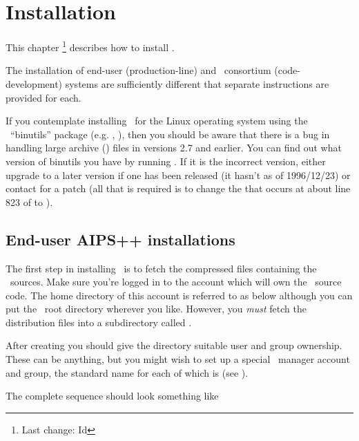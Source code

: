 \chapter{Installation}
\label{Installation}

This chapter \footnote{Last change:
$ $Id$ $}
describes how to install \aipspp.

The installation of end-user (production-line) and \aipspp\ consortium
(code-development) systems are sufficiently different that separate
instructions are provided for each.

If you contemplate installing \aipspp\ for the Linux operating system using
the \gnu\ ``binutils'' package (e.g. , ), then you should be
aware that there is a bug in handling large archive () files in
versions 2.7 and earlier.  You can find out what version of binutils you have
by running .  If it is the incorrect version, either upgrade to a
later version if one has been released (it hasn't as of 1996/12/23) or contact
 for a patch (all that is required is to change
the  that occurs at about line 823 of  to
).


\section{End-user AIPS++ installations}
\label{End-user installation}

The first step in installing \aipspp\ is to fetch the compressed 
files containing the \aipspp\ sources.  Make sure you're logged in to the
account which will own the \aipspp\ source code.  The home directory of this
account is referred to as  below although you can put the
\aipspp\ root directory wherever you like.  However, you {\em must} fetch the
distribution files into a subdirectory called .

After creating  you should give the directory suitable user and
group ownership.  These can be anything, but you might wish to set up a
special \aipspp\ manager account and group, the standard name for each of
which is  (see ).

The complete  sequence should look something like

